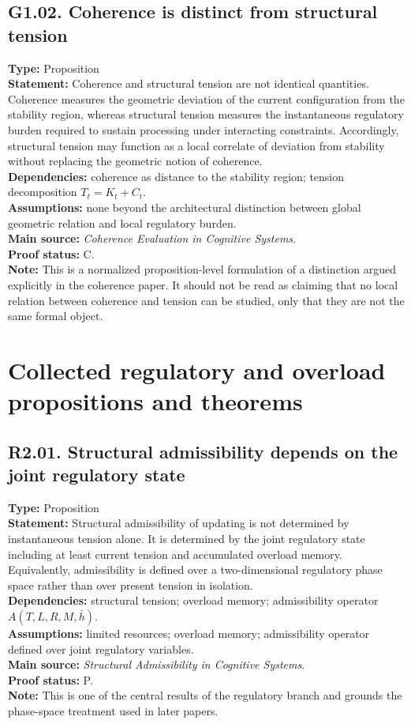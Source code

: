 \documentclass[12pt]{article}
\begin{document}
	\subsection*{G1.02. Coherence is distinct from structural tension}
	\textbf{Type:} Proposition \\
	\textbf{Statement:} Coherence and structural tension are not identical quantities. Coherence
	measures the geometric deviation of the current configuration from the stability region,
	whereas structural tension measures the instantaneous regulatory burden required to sustain
	processing under interacting constraints. Accordingly, structural tension may function as a
	local correlate of deviation from stability without replacing the geometric notion of coherence. \\
	\textbf{Dependencies:} coherence as distance to the stability region; tension decomposition
	$T_t = K_t + C_t$. \\
	\textbf{Assumptions:} none beyond the architectural distinction between global geometric relation
	and local regulatory burden. \\
	\textbf{Main source:} \emph{Coherence Evaluation in Cognitive Systems}. \\
	\textbf{Proof status:} C. \\
	\textbf{Note:} This is a normalized proposition-level formulation of a distinction argued
	explicitly in the coherence paper. It should not be read as claiming that no local relation
	between coherence and tension can be studied, only that they are not the same formal object.
	
	\section{Collected regulatory and overload propositions and theorems}
	
	\subsection*{R2.01. Structural admissibility depends on the joint regulatory state}
	\textbf{Type:} Proposition \\
	\textbf{Statement:} Structural admissibility of updating is not determined by instantaneous
	tension alone. It is determined by the joint regulatory state including at least current
	tension and accumulated overload memory. Equivalently, admissibility is defined over a
	two-dimensional regulatory phase space rather than over present tension in isolation. \\
	\textbf{Dependencies:} structural tension; overload memory; admissibility operator
	$A(T,L,R,M,\bar h)$. \\
	\textbf{Assumptions:} limited resources; overload memory; admissibility operator defined over
	joint regulatory variables. \\
	\textbf{Main source:} \emph{Structural Admissibility in Cognitive Systems}. \\
	\textbf{Proof status:} P. \\
	\textbf{Note:} This is one of the central results of the regulatory branch and grounds the
	phase-space treatment used in later papers.
	
\end{document}
